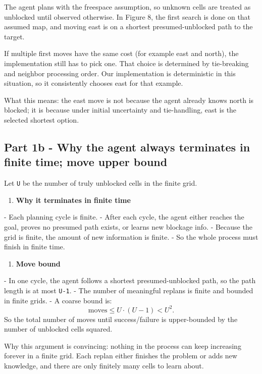 \documentclass[11pt]{article}
\begin{document}
The agent plans with the freespace assumption, so unknown cells are treated as unblocked until observed otherwise. In Figure 8, the first search is done on that assumed map, and moving east is on a shortest presumed-unblocked path to the target.

If multiple first moves have the same cost (for example east and north), the implementation still has to pick one. That choice is determined by tie-breaking and neighbor processing order. Our implementation is deterministic in this situation, so it consistently chooses east for that example.

What this means: the east move is not because the agent already knows north is blocked; it is because under initial uncertainty and tie-handling, east is the selected shortest option.

\subsection*{Part 1b - Why the agent always terminates in finite time; move upper bound}

Let \texttt{U} be the number of truly unblocked cells in the finite grid.

\begin{enumerate}[leftmargin=*]
\item \textbf{Why it terminates in finite time}
\end{enumerate}
   - Each planning cycle is finite.
   - After each cycle, the agent either reaches the goal, proves no presumed path exists, or learns new blockage info.
   - Because the grid is finite, the amount of new information is finite.
   - So the whole process must finish in finite time.

\begin{enumerate}[leftmargin=*]
\item \textbf{Move bound}
\end{enumerate}
   - In one cycle, the agent follows a shortest presumed-unblocked path, so the path length is at most \texttt{U-1}.
   - The number of meaningful replans is finite and bounded in finite grids.
   - A coarse bound is:
\[
     \text{moves} \le U \cdot (U-1) < U^2.
\]
   So the total number of moves until success/failure is upper-bounded by the number of unblocked cells squared.

Why this argument is convincing: nothing in the process can keep increasing forever in a finite grid. Each replan either finishes the problem or adds new knowledge, and there are only finitely many cells to learn about.
\end{document}
